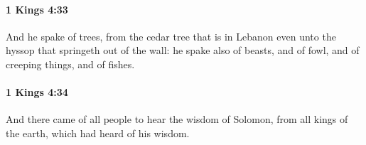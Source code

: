 		\paragraph{1 Kings 4:33} %
			\label{1KINGS-4-33}

			And he spake of trees, from the cedar tree that is in Lebanon even unto the hyssop that springeth out of the wall: he spake also of beasts, and of fowl, and of creeping things, and of fishes.


		\paragraph{1 Kings 4:34} %
			\label{1KINGS-4-34}

			And there came of all people to hear the wisdom of Solomon, from all kings of the earth, which had heard of his wisdom.


